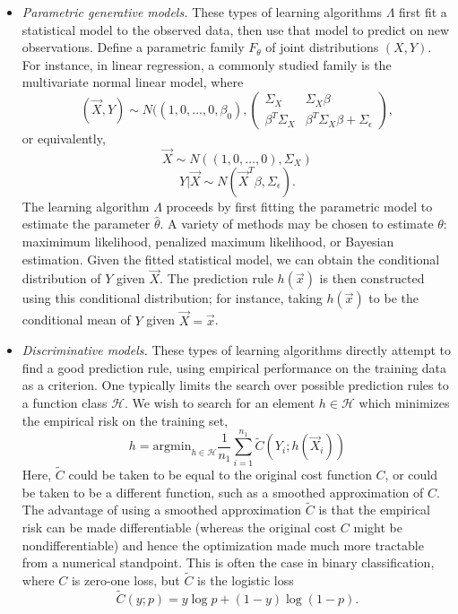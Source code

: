 \begin{itemize}
\item \emph{Parametric generative models.}  These types of learning
  algorithms $\Lambda$ first fit a statistical model to the observed
  data, then use that model to predict on new observations. Define a
  parametric family $F_\theta$ of joint distributions $(X, Y)$.  For
  instance, in linear regression, a commonly studied family is the
  multivariate normal linear model, where
\[
(\vec{X}, Y) \sim N((1,0,\hdots,0, \beta_0), \begin{pmatrix}\Sigma_X & \Sigma_X \beta \\
\beta^T \Sigma_X & \beta^T \Sigma_X \beta + \Sigma_\epsilon\end{pmatrix},
\]
or equivalently,
\[
\vec{X} \sim N((1,0,\hdots,0), \Sigma_X)
\]
\[
Y|\vec{X} \sim N(\vec{X}^T \beta, \Sigma_\epsilon).
\]
The learning algorithm $\Lambda$ proceeds by first fitting the
parametric model to estimate the parameter $\hat{\theta}$.  A variety
of methods may be chosen to estimate $\theta$: maximimum likelihood,
penalized maximum likelihood, or Bayesian estimation.  Given the
fitted statistical model, we can obtain the conditional distribution
of $Y$ given $\vec{X}$.  The prediction rule $h(\vec{x})$ is then
constructed using this conditional distribution; for instance, taking
$h(\vec{x})$ to be the conditional mean of $Y$ given $\vec{X} =
\vec{x}$.
\item \emph{Discriminative models.} These types of learning algorithms
  directly attempt to find a good prediction rule, using empirical
  performance on the training data as a criterion. One typically
  limits the search over possible prediction rules to a function class
  $\mathcal{H}$.  We wish to search for an element $h \in \mathcal{H}$
  which minimizes the empirical risk on the training set,
\[
h = \text{argmin}_{h \in \mathcal{H}} \frac{1}{n_1} \sum_{i=1}^{n_1} \tilde{C}(Y_i; h(\vec{X}_i))
\]
Here, $\tilde{C}$ could be taken to be equal to the original cost
function $C$, or could be taken to be a different function, such as a
smoothed approximation of $C$.  The advantage of using a smoothed
approximation $\tilde{C}$ is that the empirical risk can be made
differentiable (whereas the original cost $C$ might be
nondifferentiable) and hence the optimization made much more tractable
from a numerical standpoint.  This is often the case in binary
classification, where $C$ is zero-one loss, but $\tilde{C}$ is the logistic loss
\[
\tilde{C}(y; p) = y \log p + (1-y) \log (1-p).
\]
\end{itemize}
